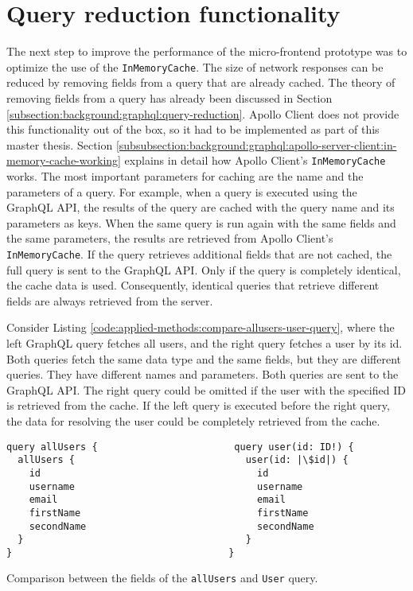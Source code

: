 \section{Query reduction functionality}\label{section:applied-methods:query-reduction}

The next step to improve the performance of the micro-frontend prototype was to optimize the use of the \texttt{InMemoryCache}. The size of network responses can be reduced by removing fields from a query that are already cached. The theory of removing fields from a query has already been discussed in Section \ref{subsection:background:graphql:query-reduction}. Apollo Client does not provide this functionality out of the box, so it had to be implemented as part of this master thesis. Section \ref{subsubsection:background:graphql:apollo-server-client:in-memory-cache-working} explains in detail how Apollo Client's \texttt{InMemoryCache} works. The most important parameters for caching are the name and the parameters of a query. For example, when a query is executed using the GraphQL \ac{API}, the results of the query are cached with the query name and its parameters as keys. When the same query is run again with the same fields and the same parameters, the results are retrieved from Apollo Client's \texttt{InMemoryCache}. If the query retrieves additional fields that are not cached, the full query is sent to the GraphQL \ac{API}. Only if the query is completely identical, the cache data is used. Consequently, identical queries that retrieve different fields are always retrieved from the server.

\bigskip

\noindent Consider Listing \ref{code:applied-methods:compare-allusers-user-query}, where the left GraphQL query fetches all users, and the right query fetches a user by its id. Both queries fetch the same data type and the same fields, but they are different queries. They have different names and parameters. Both queries are sent to the GraphQL \ac{API}. The right query could be omitted if the user with the specified ID is retrieved from the cache. If the left query is executed before the right query, the data for resolving the user could be completely retrieved from the cache.

\ifshowListings
\begin{listing}[H]
  \begin{verbatim}
query allUsers {                        query user(id: ID!) {
  allUsers {                              user(id: |\$id|) {
    id                                      id
    username                                username
    email                                   email
    firstName                               firstName
    secondName                              secondName
  }                                       }
}                                      }
  \end{verbatim}
  \caption{Comparison between the fields of the \texttt{allUsers} and \texttt{User} query.}\label{code:applied-methods:compare-allusers-user-query}
\end{listing}
\fi

